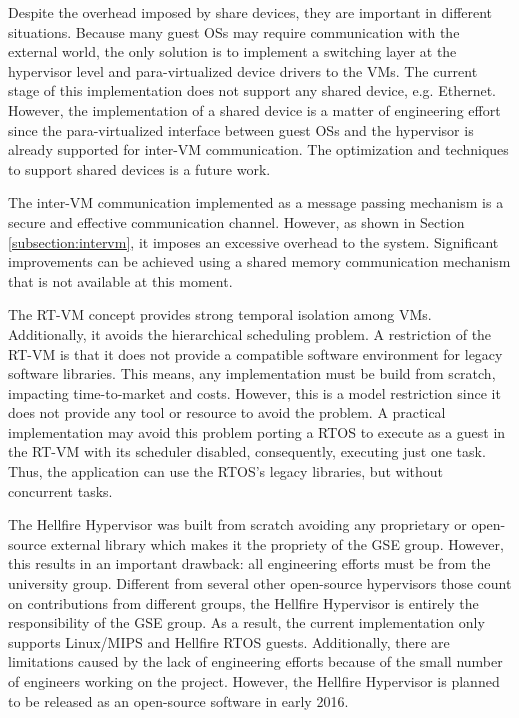 Despite the overhead imposed by share devices, they are important in different situations. Because many guest OSs may require communication with the external world, the only solution is to implement a switching layer at the hypervisor level and para-virtualized device drivers to the VMs. The current stage of this implementation does not support any shared device, e.g. Ethernet. However, the implementation of a shared device is a matter of engineering effort since the para-virtualized interface between guest OSs and the hypervisor is already supported for inter-VM communication. The optimization and techniques to support shared devices is a future work.

The inter-VM communication implemented as a message passing mechanism is a secure and effective communication channel. However, as shown in Section \ref{subsection:intervm}, it imposes an excessive overhead to the system. Significant improvements can be achieved using a shared memory communication mechanism that is not available at this moment. 

The RT-VM concept provides strong temporal isolation among VMs. Additionally, it avoids the hierarchical scheduling problem. A restriction of the RT-VM is that it does not provide a compatible software environment for legacy software libraries. This means, any implementation must be build from scratch, impacting time-to-market and costs. However, this is a model restriction since it does not provide any tool or resource to avoid the problem. A practical implementation may avoid this problem porting a RTOS to execute as a guest in the RT-VM with its scheduler disabled, consequently, executing just one task. Thus, the application can use the RTOS's legacy libraries, but without concurrent tasks. 

The Hellfire Hypervisor was built from scratch avoiding any proprietary or open-source external library which makes it the propriety of the GSE group. However, this results in an important drawback: all engineering efforts must be from the university group. Different from several other open-source hypervisors those count on contributions from different groups, the Hellfire Hypervisor is entirely the responsibility of the GSE group. As a result, the current implementation only supports  Linux/MIPS and Hellfire RTOS guests. Additionally, there are limitations caused by the lack of engineering efforts because of  the small number of engineers working on the project. However, the Hellfire Hypervisor is planned to be released as an open-source software in early 2016. 


